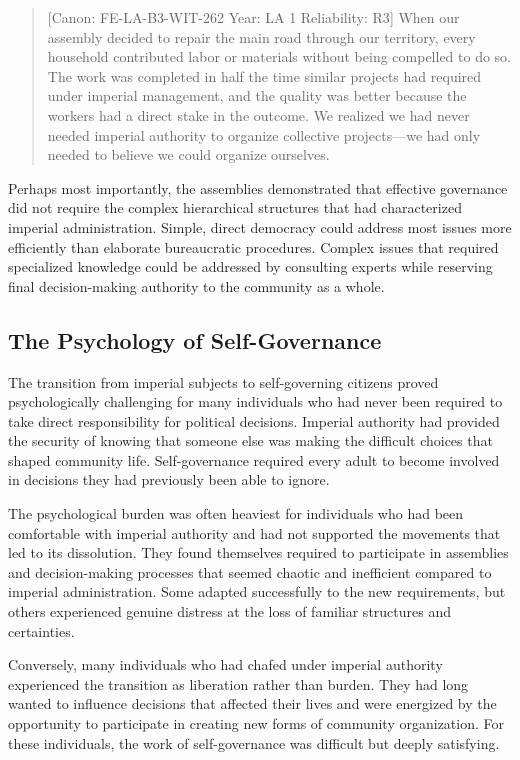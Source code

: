 \begin{quote}
{[}Canon: FE-LA-B3-WIT-262 \textbar{} Year: LA 1 \textbar{} Reliability:
R3{]} When our assembly decided to repair the main road through our
territory, every household contributed labor or materials without being
compelled to do so. The work was completed in half the time similar
projects had required under imperial management, and the quality was
better because the workers had a direct stake in the outcome. We
realized we had never needed imperial authority to organize collective
projects---we had only needed to believe we could organize ourselves.
\end{quote}

Perhaps most importantly, the assemblies demonstrated that effective
governance did not require the complex hierarchical structures that had
characterized imperial administration. Simple, direct democracy could
address most issues more efficiently than elaborate bureaucratic
procedures. Complex issues that required specialized knowledge could be
addressed by consulting experts while reserving final decision-making
authority to the community as a whole.

\subsection{The Psychology of
Self-Governance}\label{the-psychology-of-self-governance}

The transition from imperial subjects to self-governing citizens proved
psychologically challenging for many individuals who had never been
required to take direct responsibility for political decisions. Imperial
authority had provided the security of knowing that someone else was
making the difficult choices that shaped community life. Self-governance
required every adult to become involved in decisions they had previously
been able to ignore.

The psychological burden was often heaviest for individuals who had been
comfortable with imperial authority and had not supported the movements
that led to its dissolution. They found themselves required to
participate in assemblies and decision-making processes that seemed
chaotic and inefficient compared to imperial administration. Some
adapted successfully to the new requirements, but others experienced
genuine distress at the loss of familiar structures and certainties.

Conversely, many individuals who had chafed under imperial authority
experienced the transition as liberation rather than burden. They had
long wanted to influence decisions that affected their lives and were
energized by the opportunity to participate in creating new forms of
community organization. For these individuals, the work of
self-governance was difficult but deeply satisfying.

